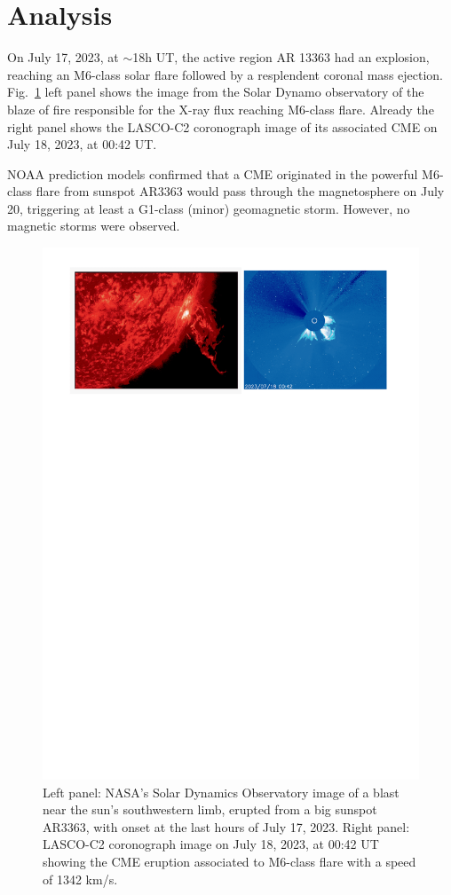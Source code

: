 \documentclass[twocolumn]{aastex63}
\begin{document}
\section{Analysis}

On July 17, 2023, at $\sim$18h UT, the active region AR 13363 had an explosion, reaching an M6-class solar flare followed by a resplendent coronal mass ejection. Fig.~\ref{flare_cme} left panel shows the image from the Solar Dynamo observatory of the blaze of fire responsible for the X-ray flux reaching M6-class flare. Already the right panel shows the LASCO-C2 coronograph image of its associated CME on July 18, 2023, at 00:42 UT.

NOAA prediction models confirmed that a CME originated in the powerful M6-class flare from sunspot AR3363 would pass through the magnetosphere on July 20, triggering at least a G1-class (minor) geomagnetic storm. However, no magnetic storms were observed. 

\begin{figure}[]
\vspace*{-0.7cm}
\hspace*{-1.0cm}
\centering
\includegraphics[clip,width=0.56
\textwidth,height=0.80\textheight,angle=0.] {Fig2.png}
\vspace*{-13.5cm}
\caption{Left panel:  NASA's Solar Dynamics Observatory image of a blast near the sun's southwestern limb, erupted from a big sunspot AR3363, with onset at the last hours of July 17, 2023.
Right panel: LASCO-C2 coronograph image on July 18, 2023, at 
00:42 UT showing the CME eruption associated to M6-class flare with a speed of 1342 km/s. 
}
\label{flare_cme}
\end{figure} 
\end{document}
